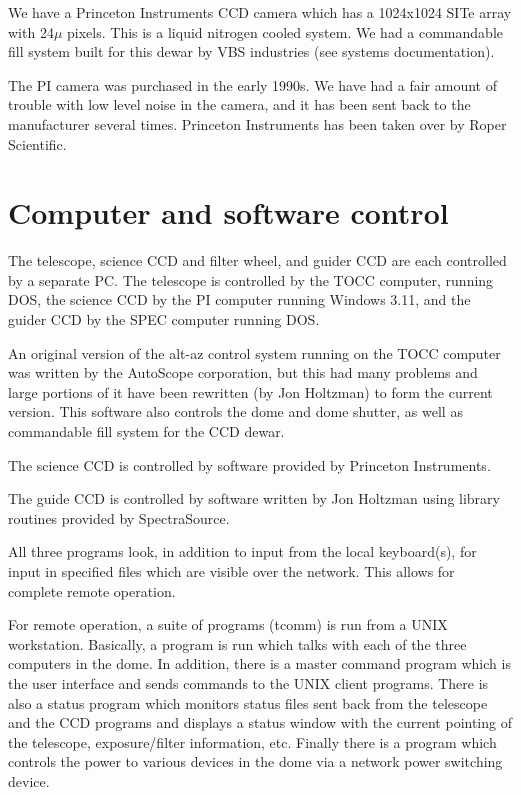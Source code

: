 \documentclass{article}[12pt]
\begin{document}
We have a Princeton Instruments CCD camera which has a 1024x1024
SITe array with 24$\mu$ pixels. This is a liquid nitrogen cooled
system. We had a commandable fill system built for this dewar by 
VBS industries (see systems documentation).

The PI camera was purchased in the early 1990s. We have had a fair 
amount of trouble with low level noise in the camera, and it has
been sent back to the manufacturer several times. Princeton Instruments
has been taken over by Roper Scientific.

\section{Computer and software control}

The telescope, science CCD and filter wheel, and guider CCD are each
controlled by a separate PC. The telescope is controlled by the TOCC
computer, running DOS, the science CCD by the PI computer running 
Windows 3.11, and the guider CCD by the SPEC computer running DOS.

An original version of the alt-az control system running on the TOCC
computer was written by the AutoScope corporation, but this had many
problems and large portions of it have been rewritten (by Jon Holtzman) 
to form the current version. This software also controls the dome
and dome shutter, as well as commandable fill system for the CCD dewar.

The science CCD is controlled by software provided by Princeton Instruments.

The guide CCD is controlled by software written by Jon Holtzman using
library routines provided by SpectraSource.

All three programs look, in addition to input from the local keyboard(s),
for input in specified files which are visible over the network. This
allows for complete remote operation.

For remote operation, a suite of programs (tcomm) is run from a UNIX
workstation. Basically, a program is run which talks with each of the
three computers in the dome. In addition, there is a master command
program which is the user interface and sends commands to the UNIX client
programs. There is also a status program which monitors status files sent
back from the telescope and the CCD programs and displays a status
window with the current pointing of the telescope, exposure/filter 
information, etc.  Finally there is a program which controls the power
to various devices in the dome via a network power switching device.
\end{document}
